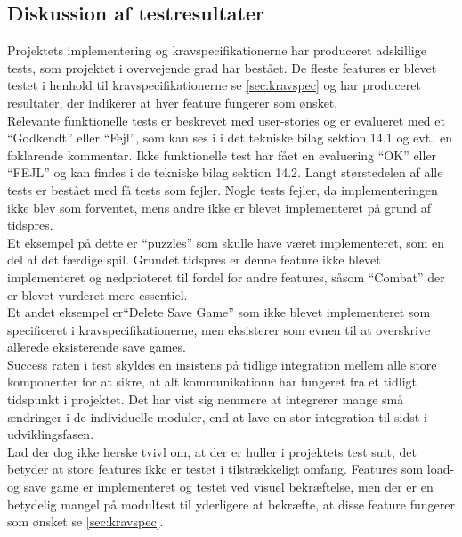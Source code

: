 \newpage
\subsection{Diskussion af testresultater}
Projektets implementering og kravspecifikationerne har produceret adskillige tests, som 
projektet i overvejende grad har bestået. De fleste features er blevet
testet i henhold til kravspecifikationerne se \autoref{sec:kravspec} og har produceret 
resultater, der indikerer at hver feature fungerer som ønsket. \\

\noindent Relevante funktionelle tests er beskrevet med user-stories og er evalueret med et ``Godkendt''
eller ``Fejl'', som kan ses i i det tekniske bilag sektion 14.1 og evt.\ en foklarende kommentar. 
Ikke funktionelle 
test har fået en evaluering ``OK'' eller ``FEJL'' og kan findes i de tekniske bilag sektion 14.2.
Langt størstedelen af alle tests er bestået med få tests som fejler. 
Nogle tests fejler, da implementeringen ikke blev som forventet, mens andre ikke er blevet 
implementeret på grund af tidspres. \\

\noindent Et eksempel på dette er ``puzzles'' som skulle have været implementeret, som en del af det færdige spil.
Grundet tidspres er denne feature ikke blevet implementeret og
nedprioteret til fordel for andre features, såsom ``Combat'' der er blevet vurderet mere essentiel.\\

\noindent Et andet eksempel er``Delete Save Game'' som ikke blevet implementeret som specificeret i kravspecifikationerne, men
eksisterer som evnen til at overskrive allerede eksisterende save games.\\
Success raten i test skyldes en insistens på tidlige integration mellem alle store komponenter for at sikre, at 
alt kommunikationn har fungeret fra et tidligt 
tidspunkt i projektet. Det har vist sig nemmere at integrerer mange små ændringer i de individuelle moduler, end at lave en stor integration til sidst i udviklingsfasen.\\

\noindent Lad der dog ikke herske tvivl om, at der er huller i projektets test suit, det
betyder at store features ikke er testet i tilstrækkeligt omfang. Features som load- og save game er implementeret og testet ved visuel bekræftelse, men der er en betydelig mangel på modultest til yderligere at bekræfte, at disse feature fungerer som ønsket se \autoref{sec:kravspec}. \\

\newpage